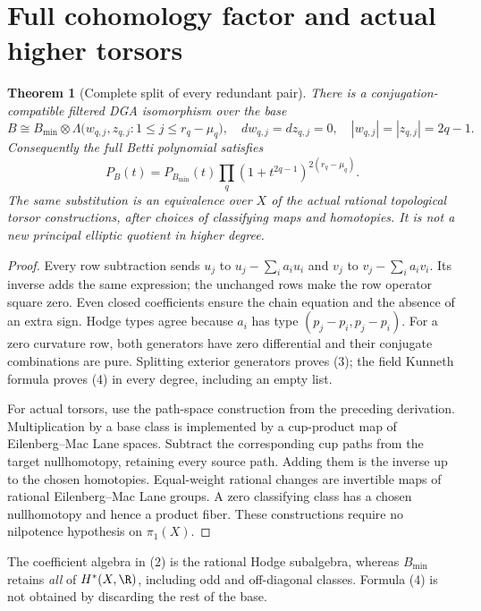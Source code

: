\documentclass[11pt]{article}
\newtheorem{theorem}{Theorem}
\begin{document}
\section{Full cohomology factor and actual higher torsors}
\begin{theorem}[Complete split of every redundant pair]
There is a conjugation-compatible filtered DGA isomorphism over the base
\[
 B\cong B_{\min}\otimes
 \Lambda\bigl(w_{q,j},z_{q,j}:1\leq j\leq r_q-\mu_q\bigr),
 \quad dw_{q,j}=dz_{q,j}=0,\quad |w_{q,j}|=|z_{q,j}|=2q-1.            \tag{3}
\]
Consequently the full Betti polynomial satisfies
\[
 P_B(t)=P_{B_{\min}}(t)\prod_q(1+t^{2q-1})^{2(r_q-\mu_q)}.           \tag{4}
\]
The same substitution is an equivalence over $X$ of the actual rational
topological torsor constructions, after choices of classifying maps and
homotopies. It is not a new principal elliptic quotient in higher degree.
\end{theorem}
\begin{proof}
Every row subtraction sends $u_j$ to $u_j-\sum_i a_i u_i$ and $v_j$ to
$v_j-\sum_i a_i v_i$. Its inverse adds the same expression; the unchanged
rows make the row operator square zero. Even closed coefficients ensure
the chain equation and the absence of an extra sign. Hodge types agree
because $a_i$ has type $(p_j-p_i,p_j-p_i)$. For a zero curvature row,
both generators have zero differential and their conjugate combinations
are pure. Splitting exterior generators proves (3); the field Kunneth
formula proves (4) in every degree, including an empty list.

For actual torsors, use the path-space construction from the preceding
derivation. Multiplication by a base class is implemented by a cup-product
map of Eilenberg--Mac Lane spaces. Subtract the corresponding cup paths
from the target nullhomotopy, retaining every source path. Adding them
is the inverse up to the chosen homotopies. Equal-weight rational changes
are invertible maps of rational Eilenberg--Mac Lane groups. A zero
classifying class has a chosen nullhomotopy and hence a product fiber.
These constructions require no nilpotence hypothesis on $\pi_1(X)$.
\end{proof}
The coefficient algebra in (2) is the rational Hodge subalgebra, whereas
$B_{\min}$ retains \emph{all} of $H^*(X,\R)$, including odd and off-diagonal
classes. Formula (4) is not obtained by discarding the rest of the base.
\end{document}
